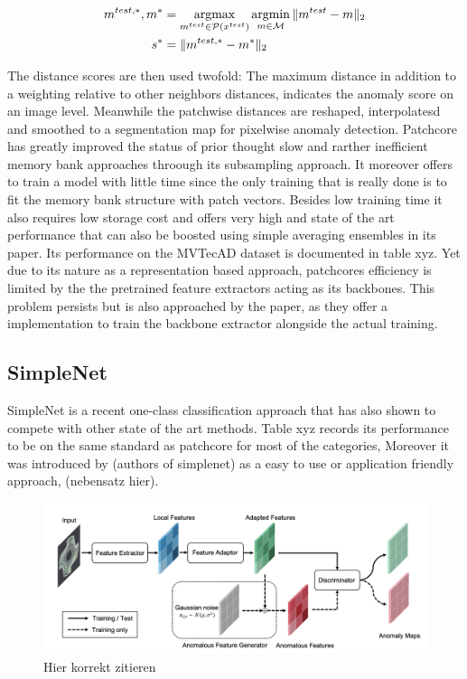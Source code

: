\begin{equation}
\label{eq:patchcoredistance}
\begin{split}
m^{test, *}, m^{*} &= \operatorname*{argmax}_{m^{test} \in \mathcal{P}(x^{test})} \operatorname*{argmin}_{m \in \mathcal{M}} \| m^{test} - m \|_{2} \\
s^{*} &= \| m^{test, *} - m^{*} \|_{2}
\end{split}
\end{equation}

The distance scores are then used twofold: The maximum distance in addition to a weighting relative to other neighbors distances, indicates the anomaly score on an image level. Meanwhile the patchwise distances are reshaped, 
interpolatesd and smoothed to a segmentation map for pixelwise anomaly detection.
\newline
Patchcore has greatly improved the status of prior thought slow and rarther inefficient memory bank approaches throough its subsampling approach. It moreover offers to train a model with little time 
since the only training that is really done is to fit the memory bank structure with patch vectors. Besides low training time it also requires low storage cost and offers very high and state of the art 
performance that can also be boosted using simple averaging ensembles in its paper. Its performance on the MVTecAD dataset \cite{MVTEC_Bergmann_2021} is documented in table xyz. Yet due to its nature as a representation based approach, patchcores 
efficiency is limited by the the pretrained feature extractors acting as its backbones. This problem persists but is also approached by the paper, as they offer a implementation to train the backbone 
extractor alongside the actual training.


\subsection{SimpleNet}
\label{subsec:simplenet}
SimpleNet \cite{liu2023simplenet} is a recent one-class classification approach that has also shown to compete with other state of the art methods. Table xyz records its performance to be on the same standard as patchcore 
for most of the categories, %
Moreover it was introduced by (authors of simplenet) as a easy to use or application friendly approach, (nebensatz hier).

\begin{figure}[ht]
    \centering
    \includegraphics[width=\textwidth]{figures/simplenet_architecture.png}
    \caption{Hier korrekt zitieren}
    \label{fig:simplenetpipeline}
\end{figure}

